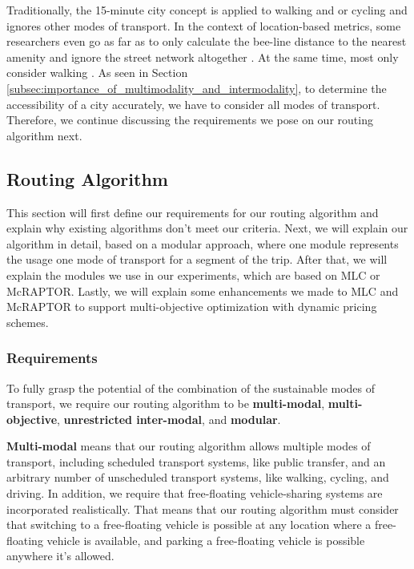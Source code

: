 Traditionally, the 15-minute city concept is applied to walking and or cycling and ignores other modes of transport.
In the context of location-based metrics, some researchers even go as far as to only calculate the bee-line distance to the nearest amenity and ignore the street network altogether . At the same time, most only consider walking .
As seen in Section \ref{subsec:importance_of_multimodality_and_intermodality}, to determine the accessibility of a city accurately, we have to consider all modes of transport.
Therefore, we continue discussing the requirements we pose on our routing algorithm next.


\subsection{Routing Algorithm}
\label{subs:routing_algorithm}

This section will first define our requirements for our routing algorithm and explain why existing algorithms don't meet our criteria.
Next, we will explain our algorithm in detail, based on a modular approach, where one module represents the usage one mode of transport for a segment of the trip.
After that, we will explain the modules we use in our experiments, which are based on MLC or McRAPTOR.
Lastly, we will explain some enhancements we made to MLC and McRAPTOR to support multi-objective optimization with dynamic pricing schemes.

\subsubsection{Requirements}
\label{subsubsec:requirements}

To fully grasp the potential of the combination of the sustainable modes of transport, we require our routing algorithm to be \textbf{multi-modal}, \textbf{multi-objective}, \textbf{unrestricted inter-modal}, and \textbf{modular}.

\textbf{Multi-modal} means that our routing algorithm allows multiple modes of transport, including scheduled transport systems, like public transfer, and an arbitrary number of unscheduled transport systems, like walking, cycling, and driving.
In addition, we require that free-floating vehicle-sharing systems are incorporated realistically.
That means that our routing algorithm must consider that switching to a free-floating vehicle is possible at any location where a free-floating vehicle is available, and parking a free-floating vehicle is possible anywhere it's allowed.


